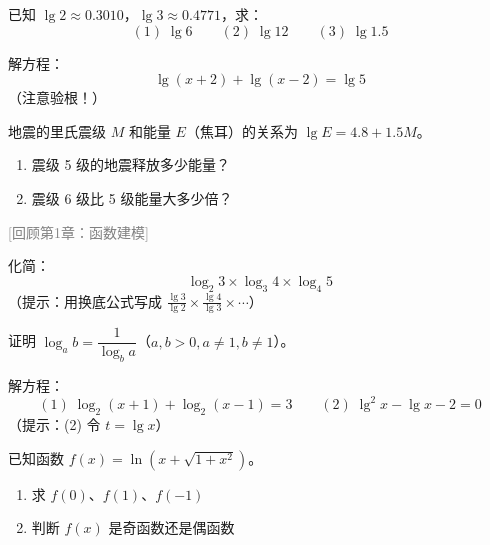 \begin{exercise}[3]
已知 \(\lg 2 \approx 0.3010\)，\(\lg 3 \approx 0.4771\)，求：
\[
(1)\; \lg 6 \qquad (2)\; \lg 12 \qquad (3)\; \lg 1.5
\]
\end{exercise}


\begin{exercise}[3]
解方程：
\[
\lg(x+2) + \lg(x-2) = \lg 5
\]
（注意验根！）

\end{exercise}


\begin{exercise}[3]
地震的里氏震级 \(M\) 和能量 \(E\)（焦耳）的关系为 \(\lg E = 4.8 + 1.5M\)。
\begin{enumerate}
  \item[(1)] 震级 5 级的地震释放多少能量？
  \item[(2)] 震级 6 级比 5 级能量大多少倍？
\end{enumerate}

\end{exercise}

\qquad \textcolor{gray}{[回顾第1章：函数建模]}%

\begin{exercise}[3]
化简：
\[
\log_2 3 \times \log_3 4 \times \log_4 5
\]
（提示：用换底公式写成 \(\frac{\lg 3}{\lg 2} \times \frac{\lg 4}{\lg 3} \times \cdots\)）

\end{exercise}


\begin{exercise}[3]
证明 \(\log_a b = \dfrac{1}{\log_b a}\)（\(a,b > 0, a\neq1, b\neq1\)）。


\end{exercise}


\begin{exercise}[4]
解方程：
\[
(1)\; \log_2(x+1) + \log_2(x-1) = 3 \qquad
(2)\; \lg^2 x - \lg x - 2 = 0
\]
（提示：(2) 令 \(t = \lg x\)）

\end{exercise}


\begin{exercise}[4]
已知函数 \(f(x) = \ln(x + \sqrt{1 + x^2})\)。
\begin{enumerate}
  \item[(1)] 求 \(f(0)\)、\(f(1)\)、\(f(-1)\)
  \item[(2)] 判断 \(f(x)\) 是奇函数还是偶函数
\end{enumerate}

\end{exercise}


